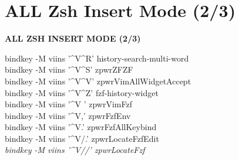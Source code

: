 \documentclass[11pt,a4paper,twoside]{book}
\begin{document}
\vspace{16pt}

\section{ALL Zsh Insert Mode (2/3)}


\vspace{10pt}
{\large\bfseries\color{neoncyan} ALL ZSH INSERT MODE (2/3)}\vspace{6pt}

bindkey -M viins '\textasciicircum{}V\textasciicircum{}R' history-search-multi-word\\
bindkey -M viins '\textasciicircum{}V\textasciicircum{}S' zpwrZFZF\\
bindkey -M viins '\textasciicircum{}V\textasciicircum{}V' zpwrVimAllWidgetAccept\\
bindkey -M viins '\textasciicircum{}V\textasciicircum{}Z' fzf-history-widget\\
bindkey -M viins '\textasciicircum{}V ' zpwrVimFzf\\
bindkey -M viins '\textasciicircum{}V,' zpwrFzfEnv\\
bindkey -M viins '\textasciicircum{}V.' zpwrFzfAllKeybind\\
bindkey -M viins '\textasciicircum{}V/.' zpwrLocateFzfEdit\\

{\small\itshape\color{dimtext} bindkey -M viins '\textasciicircum{}V//' zpwrLocateFzf}
\end{document}
